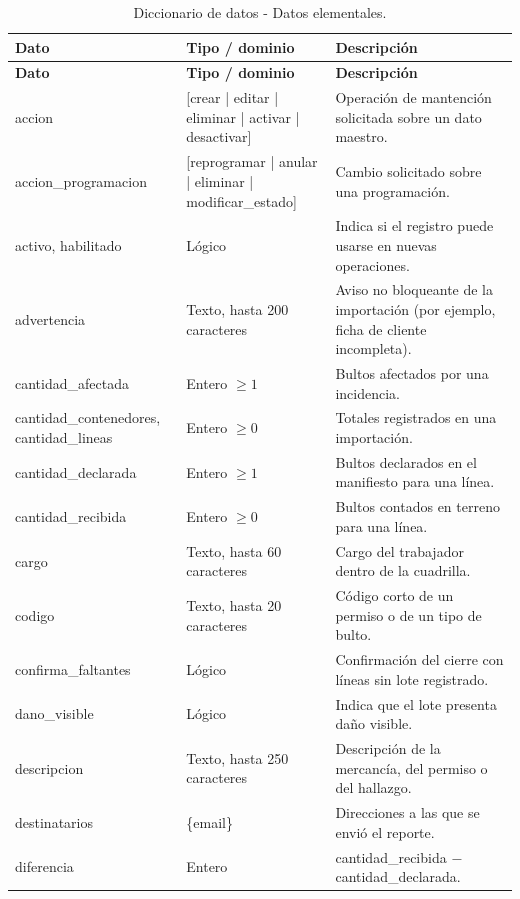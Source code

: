 {\estilotabla
\begin{longtable}{|L{3.3cm}|L{3.3cm}|L{8.0cm}|}
\caption{Diccionario de datos - Datos elementales.}
\label{tab:elementales}\\
\hline
{}
\textbf{Dato} & \textbf{Tipo / dominio} & \textbf{Descripción} \\ \hline
\endfirsthead
\hline
{}
\textbf{Dato} & \textbf{Tipo / dominio} & \textbf{Descripción} \\ \hline
\endhead
accion & [crear | editar | eliminar | activar | desactivar] & Operación de mantención
solicitada sobre un dato maestro. \\ \hline
accion\_programacion & [reprogramar | anular | eliminar | modificar\_estado] & Cambio
solicitado sobre una programación. \\ \hline
activo, habilitado & Lógico & Indica si el registro puede usarse en nuevas operaciones. \\
\hline
advertencia & Texto, hasta 200 caracteres & Aviso no bloqueante de la importación (por
ejemplo, ficha de cliente incompleta). \\ \hline
cantidad\_afectada & Entero $\geq 1$ & Bultos afectados por una incidencia. \\ \hline
cantidad\_contenedores, cantidad\_lineas & Entero $\geq 0$ & Totales registrados en una
importación. \\ \hline
cantidad\_declarada & Entero $\geq 1$ & Bultos declarados en el manifiesto para una línea.
\\ \hline
cantidad\_recibida & Entero $\geq 0$ & Bultos contados en terreno para una línea. \\ \hline
cargo & Texto, hasta 60 caracteres & Cargo del trabajador dentro de la cuadrilla. \\ \hline
codigo & Texto, hasta 20 caracteres & Código corto de un permiso o de un tipo de bulto. \\
\hline
confirma\_faltantes & Lógico & Confirmación del cierre con líneas sin lote registrado. \\
\hline
dano\_visible & Lógico & Indica que el lote presenta daño visible. \\ \hline
descripcion & Texto, hasta 250 caracteres & Descripción de la mercancía, del permiso o del
hallazgo. \\ \hline
destinatarios & \{email\} & Direcciones a las que se envió el reporte. \\ \hline
diferencia & Entero & cantidad\_recibida $-$ cantidad\_declarada. \\ \hline

\end{longtable}}
